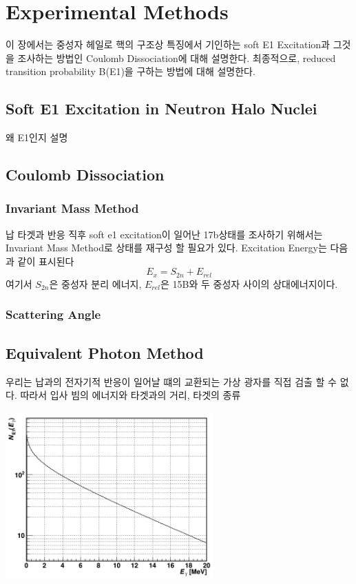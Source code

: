 \chapter{Experimental Methods}
이 장에서는 중성자 헤일로 핵의 구조상 특징에서 기인하는 soft E1 Excitation과 그것을 조사하는 방법인 Coulomb Dissociation에 대해 설명한다. 최종적으로, reduced transition probability B(E1)을 구하는 방법에 대해 설명한다.

\section{Soft E1 Excitation in Neutron Halo Nuclei}
왜 E1인지 설명
\section{Coulomb Dissociation}

\subsection{Invariant Mass Method}
납 타겟과 반응 직후 soft e1 excitation이 일어난 17b상태를 조사하기 위해서는 Invariant Mass Method로 상태를 재구성 할 필요가 있다. Excitation Energy는 다음과 같이 표시된다
\begin{displaymath}
{E}_{x}={S}_{2n}+{E}_{rel}
\end{displaymath}
여기서 ${S}_{2n}$은 중성자 분리 에너지, ${E}_{rel}$은 15B와 두 중성자 사이의 상대에너지이다. 
\subsection{Scattering Angle}

\section{Equivalent Photon Method}
우리는 납과의 전자기적 반응이 일어날 떄의 교환되는 가상 광자를 직접 검출 할 수 없다. 따라서 입사 빔의 에너지와 타겟과의 거리, 타겟의 종류
\begin{center}
\includegraphics[width=8cm]{Figure/chapter2/virtual_photon_distribution.png}    
\end{center}
